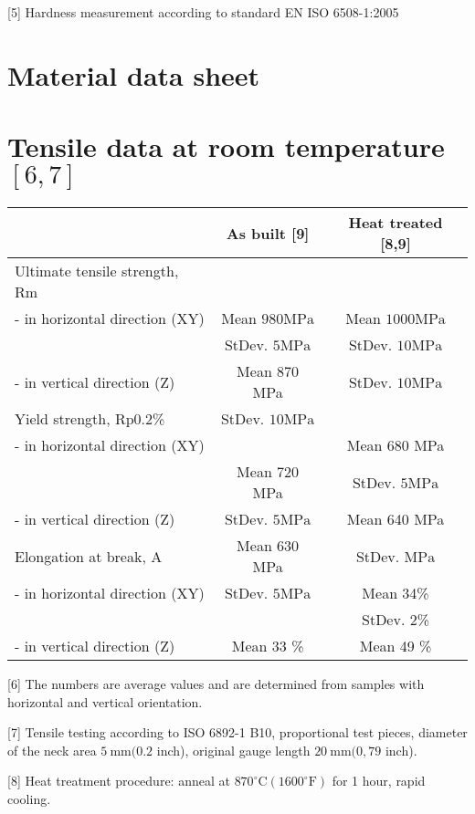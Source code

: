 \documentclass[10pt]{article}
\begin{document}
[5] Hardness measurement according to standard EN ISO 6508-1:2005

\section*{Material data sheet}
\section*{Tensile data at room temperature $[6,7]$}
\begin{center}
\begin{tabular}{lcc}
\hline
 & As built [9] & Heat treated [8,9] \\
\hline
Ultimate tensile strength, Rm &  &  \\
\hline
- in horizontal direction (XY) & Mean $980 \mathrm{MPa}$ & Mean $1000 \mathrm{MPa}$ \\
 & StDev. $5 \mathrm{MPa}$ & StDev. $10 \mathrm{MPa}$ \\
\hline
- in vertical direction (Z) & Mean 870 MPa & StDev. $10 \mathrm{MPa}$ \\
\hline
Yield strength, Rp0.2\% & StDev. $10 \mathrm{MPa}$ &  \\
\hline
- in horizontal direction (XY) &  & Mean 680 MPa \\
 & Mean 720 MPa & StDev. $5 \mathrm{MPa}$ \\
\hline
- in vertical direction (Z) & StDev. $5 \mathrm{MPa}$ & Mean 640 MPa \\
\hline
Elongation at break, A & Mean 630 MPa & StDev. $\mathrm{MPa}$ \\
\hline
- in horizontal direction (XY) & StDev. $5 \mathrm{MPa}$ & Mean 34\% \\
 &  & StDev. 2\% \\
\hline
- in vertical direction (Z) & Mean 33 \% & Mean 49 \% \\
\hline
\end{tabular}
\end{center}

[6] The numbers are average values and are determined from samples with horizontal and vertical orientation.

[7] Tensile testing according to ISO 6892-1 B10, proportional test pieces, diameter of the neck area $5 \mathrm{~mm}(0.2$ inch), original gauge length $20 \mathrm{~mm}(0,79$ inch).

[8] Heat treatment procedure: anneal at $870^{\circ} \mathrm{C}\left(1600^{\circ} \mathrm{F}\right)$ for 1 hour, rapid cooling.
\end{document}
